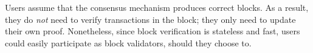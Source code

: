 Users assume that the consensus mechanism produces correct blocks.
As a result, they do \textit{not} need to verify transactions in the block; they only need to update their own proof.
Nonetheless, since block verification is stateless and fast, users could easily participate as block validators, should they choose to.
